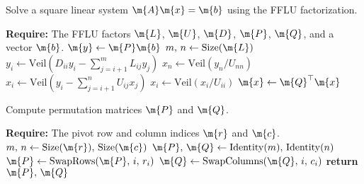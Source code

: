 \begin{breakablealgorithm}
  \caption{Solve a square linear system $\m{A}\m{x} = \m{b}$ using the \ac{FFLU} factorization.}
  \label{chap2:alg:solve_fflu}
  \begin{algorithmic}[1]
    \State \textbf{Require:} The \ac{FFLU} factors $\m{L}$, $\m{U}$, $\m{D}$, $\m{P}$, $\m{Q}$, and a vector $\m{b}$.
     
    \State $\m{y} \gets \m{P}\m{b}$ 
    \State $m, \, n \gets \mathrm{Size}(\m{L})$ 
     
      \State $y_i \gets \mathrm{Veil}\left(D_{ii}y_{i} - {\displaystyle\sum_{j=i+1}^{m}} L_{ij}y_j\right)$ 
    \EndFor
    \State $x_n \gets \mathrm{Veil}(y_n/U_{nn})$ 
     
      \State $x_i \gets \mathrm{Veil}\left(y_i - {\displaystyle\sum_{j=i+1}^{n}} U_{ij}x_j\right)$ 
      \State $x_i \gets \mathrm{Veil}(x_i/U_{ii})$
    \EndFor
    \State $\m{x} \gets \m{Q}^\top\m{x}$ 
    \EndProcedure
  \end{algorithmic}
\end{breakablealgorithm}

\begin{breakablealgorithm}
  \caption{Compute permutation matrices $\m{P}$ and $\m{Q}$.}
  \label{chap2:alg:permutation_matrices}
  \begin{algorithmic}[1]
    \State \textbf{Require:} The pivot row and column indices $\m{r}$ and $\m{c}$.
     
    \State $m, \, n \gets \mathrm{Size}(\m{r}), \, \mathrm{Size}(\m{c})$ 
    \State $\m{P}, \, \m{Q} \gets \mathrm{Identity}(m), \, \mathrm{Identity}(n)$ 
     
      \State $\m{P} \gets \mathrm{SwapRows}(\m{P}, \, i, \, r_i)$ 
    \EndFor
     
      \State $\m{Q} \gets \mathrm{SwapColumns}(\m{Q}, \, i, \, c_i)$ 
    \EndFor
    \State \textbf{return} $\m{P}, \, \m{Q}$ 
    \EndProcedure
  \end{algorithmic}
\end{breakablealgorithm}


